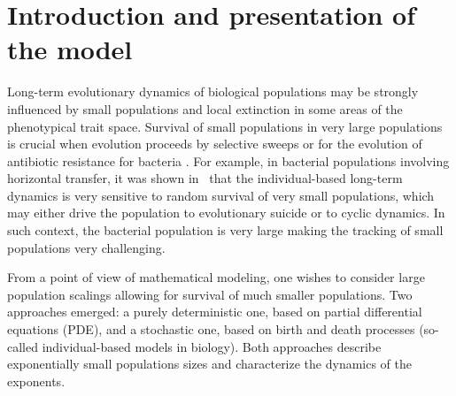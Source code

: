\documentclass[JEP,XML,SOM,Unicode,published]{cedram}
\theoremstyle{plain}
\theoremstyle{remark}
\begin{document}
\section{Introduction and presentation of the model}
\label{sec:introduction}

Long-term evolutionary dynamics of biological populations may be strongly influenced by small populations and local extinction in some areas of the phenotypical trait space. Survival of small populations in very large populations is crucial when evolution proceeds by selective sweeps \cite{keelingpalmer2008} or for the evolution of antibiotic resistance for bacteria \cite{ochmanlawrencegroisman,stewartlevin}. For example, in bacterial populations involving horizontal transfer, it was shown in~\cite{billiardcolletferrieremeleardtran,calvez20} that the individual-based long-term dynamics is very sensitive to random survival of very small populations, which may either drive the population to evolutionary suicide or to cyclic dynamics. In such context, the bacterial population is very large making the tracking of small populations very challenging.

From a point of view of mathematical modeling, one wishes to consider large population scalings allowing for survival of much smaller populations. Two approaches emerged: a purely deterministic one, based on partial differential equations (PDE), and a stochastic one, based on birth and death processes (so-called individual-based models in biology). Both approaches describe exponentially small populations sizes and characterize the dynamics of the exponents.
\end{document}
